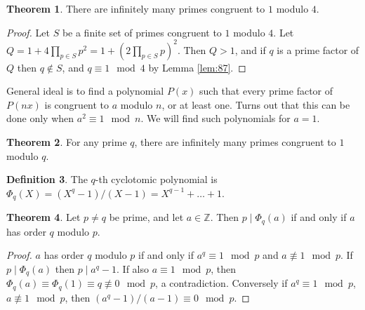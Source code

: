 \documentclass{article}
\newcommand{\Z}{\mathbb{Z}}
\newcommand{\rb}[1]{\left( #1 \right)}
\theoremstyle{definition}\newtheorem{definition}{Definition}
\theoremstyle{definition}\newtheorem{remark}[definition]{Remark}
\theoremstyle{definition}\newtheorem*{example}{Example}
\theoremstyle{definition}\newtheorem*{note}{Note}
\newtheorem{theorem}[definition]{Theorem}
\begin{document}
\begin{theorem}
There are infinitely many primes congruent to $ 1 $ modulo $ 4 $.
\end{theorem}

\begin{proof}
Let $ S $ be a finite set of primes congruent to $ 1 $ modulo $ 4 $. Let $ Q = 1 + 4\prod_{p \in S} p^2 = 1 + \rb{2\prod_{p \in S} p}^2 $. Then $ Q > 1 $, and if $ q $ is a prime factor of $ Q $ then $ q \notin S $, and $ q \equiv 1 \mod 4 $ by Lemma \ref{lem:87}.
\end{proof}

General ideal is to find a polynomial $ P\rb{x} $ such that every prime factor of $ P\rb{nx} $ is congruent to $ a $ modulo $ n $, or at least one. Turns out that this can be done only when $ a^2 \equiv 1 \mod n $. We will find such polynomials for $ a = 1 $.

\begin{theorem}
For any prime $ q $, there are infinitely many primes congruent to $ 1 $ modulo $ q $.
\end{theorem}

\begin{definition}
The $ q $-th cyclotomic polynomial is $ \Phi_q\rb{X} = \rb{X^q - 1} / \rb{X - 1} = X^{q - 1} + \dots + 1 $.
\end{definition}

\begin{theorem}
Let $ p \ne q $ be prime, and let $ a \in \Z $. Then $ p \mid \Phi_q\rb{a} $ if and only if $ a $ has order $ q $ modulo $ p $.
\end{theorem}

\begin{proof}
$ a $ has order $ q $ modulo $ p $ if and only if $ a^q \equiv 1 \mod p $ and $ a \not\equiv 1 \mod p $. If $ p \mid \Phi_q\rb{a} $ then $ p \mid a^q - 1 $. If also $ a \equiv 1 \mod p $, then $ \Phi_q\rb{a} \equiv \Phi_q\rb{1} \equiv q \not\equiv 0 \mod p $, a contradiction. Conversely if $ a^q \equiv 1 \mod p $, $ a \not\equiv 1 \mod p $, then $ \rb{a^q - 1} / \rb{a - 1} \equiv 0 \mod p $.
\end{proof}
\end{document}
